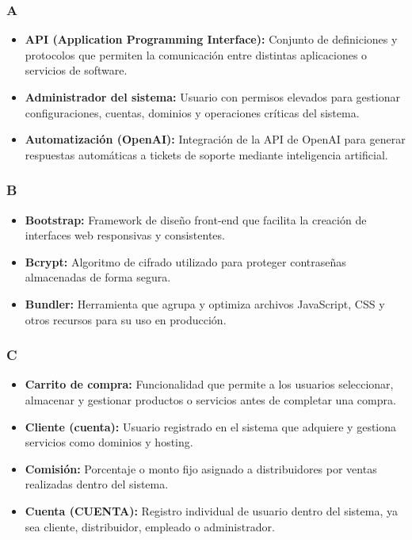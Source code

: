 \subsubsection*{A}
\begin{itemize}
    \item \textbf{API (Application Programming Interface):} Conjunto de definiciones y protocolos que permiten la comunicación entre distintas aplicaciones o servicios de software.
    \item \textbf{Administrador del sistema:} Usuario con permisos elevados para gestionar configuraciones, cuentas, dominios y operaciones críticas del sistema.
    \item \textbf{Automatización (OpenAI):} Integración de la API de OpenAI para generar respuestas automáticas a tickets de soporte mediante inteligencia artificial.
\end{itemize}

\subsubsection*{B}
\begin{itemize}
    \item \textbf{Bootstrap:} Framework de diseño front-end que facilita la creación de interfaces web responsivas y consistentes.
    \item \textbf{Bcrypt:} Algoritmo de cifrado utilizado para proteger contraseñas almacenadas de forma segura.
    \item \textbf{Bundler:} Herramienta que agrupa y optimiza archivos JavaScript, CSS y otros recursos para su uso en producción.
\end{itemize}

\subsubsection*{C}
\begin{itemize}
\item \textbf{Carrito de compra:} Funcionalidad que permite a los usuarios seleccionar, almacenar y gestionar productos o servicios antes de completar una compra.



\item \textbf{Cliente (cuenta):} Usuario registrado en el sistema que adquiere y gestiona servicios como dominios y hosting.



\item \textbf{Comisión:} Porcentaje o monto fijo asignado a distribuidores por ventas realizadas dentro del sistema.

\item \textbf{Cuenta (CUENTA):} Registro individual de usuario dentro del sistema, ya sea cliente, distribuidor, empleado o administrador.
\end{itemize}


